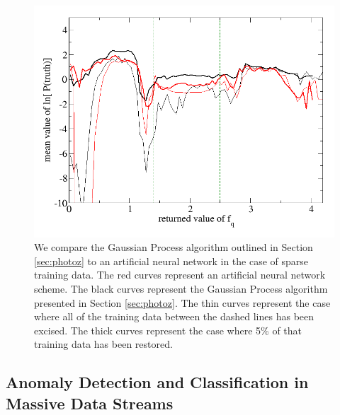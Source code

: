 \documentclass[useAMS,usenatbib,tightenlines,11pt,preprint]{aastex}
\begin{document}
\begin{figure}
\centerline{\includegraphics[scale=0.3]{doe_desert_plot.png}}
\caption{
We compare the Gaussian Process algorithm outlined in Section \ref{sec:photoz}
to an artificial neural network in the case of sparse training data.  The red
curves represent an artificial neural network scheme.  The black curves
represent the Gaussian Process algorithm presented in Section \ref{sec:photoz}. 
The thin curves represent the case where all of the training data between the
dashed lines has been excised.  The thick curves represent the case where 5\% of
that training data has been restored.
}
\label{fig:desert}
\end{figure}

\subsection{Anomaly Detection and Classification in Massive Data
 Streams}
\end{document}
